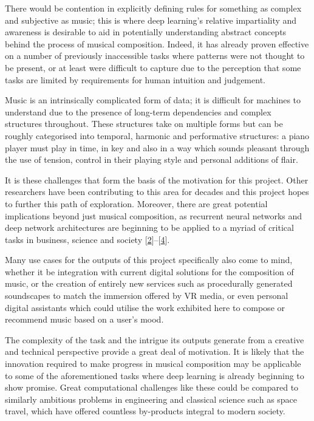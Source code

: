 \documentclass[12pt,]{article}
\begin{document}
There would be contention in explicitly defining rules for something as
complex and subjective as music; this is where deep learning's relative
impartiality and awareness is desirable to aid in potentially
understanding abstract concepts behind the process of musical
composition. Indeed, it has already proven effective on a number of
previously inaccessible tasks where patterns were not thought to be
present, or at least were difficult to capture due to the perception
that some tasks are limited by requirements for human intuition and
judgement.

Music is an intrinsically complicated form of data; it is difficult for
machines to understand due to the presence of long-term dependencies and
complex structures throughout. These structures take on multiple forms
but can be roughly categorised into temporal, harmonic and performative
structures: a piano player must play in time, in key and also in a way
which sounds pleasant through the use of tension, control in their
playing style and personal additions of flair.

It is these challenges that form the basis of the motivation for this
project. Other researchers have been contributing to this area for
decades and this project hopes to further this path of exploration.
Moreover, there are great potential implications beyond just musical
composition, as recurrent neural networks and deep network architectures
are beginning to be applied to a myriad of critical tasks in business,
science and society
{[}\protect\hyperlink{ref-deng2014deep}{2}{]}--{[}\protect\hyperlink{ref-goodfellow2016deep}{4}{]}.

Many use cases for the outputs of this project specifically also come to
mind, whether it be integration with current digital solutions for the
composition of music, or the creation of entirely new services such as
procedurally generated soundscapes to match the immersion offered by VR
media, or even personal digital assistants which could utilise the work
exhibited here to compose or recommend music based on a user's mood.

The complexity of the task and the intrigue its outputs generate from a
creative and technical perspective provide a great deal of motivation.
It is likely that the innovation required to make progress in musical
composition may be applicable to some of the aforementioned tasks where
deep learning is already beginning to show promise. Great computational
challenges like these could be compared to similarly ambitious problems
in engineering and classical science such as space travel, which have
offered countless by-products integral to modern society.
\end{document}
